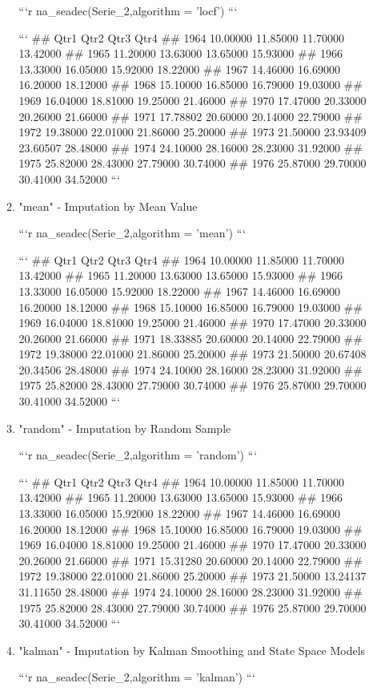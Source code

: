 \documentclass[
]{article}
\begin{document}
\begin{enumerate}
\begin{enumerate}
```r
na_seadec(Serie_2,algorithm = 'locf')
```

```
##          Qtr1     Qtr2     Qtr3     Qtr4
## 1964 10.00000 11.85000 11.70000 13.42000
## 1965 11.20000 13.63000 13.65000 15.93000
## 1966 13.33000 16.05000 15.92000 18.22000
## 1967 14.46000 16.69000 16.20000 18.12000
## 1968 15.10000 16.85000 16.79000 19.03000
## 1969 16.04000 18.81000 19.25000 21.46000
## 1970 17.47000 20.33000 20.26000 21.66000
## 1971 17.78802 20.60000 20.14000 22.79000
## 1972 19.38000 22.01000 21.86000 25.20000
## 1973 21.50000 23.93409 23.60507 28.48000
## 1974 24.10000 28.16000 28.23000 31.92000
## 1975 25.82000 28.43000 27.79000 30.74000
## 1976 25.87000 29.70000 30.41000 34.52000
```
\item "mean" - Imputation by Mean Value

```r
na_seadec(Serie_2,algorithm = 'mean')
```

```
##          Qtr1     Qtr2     Qtr3     Qtr4
## 1964 10.00000 11.85000 11.70000 13.42000
## 1965 11.20000 13.63000 13.65000 15.93000
## 1966 13.33000 16.05000 15.92000 18.22000
## 1967 14.46000 16.69000 16.20000 18.12000
## 1968 15.10000 16.85000 16.79000 19.03000
## 1969 16.04000 18.81000 19.25000 21.46000
## 1970 17.47000 20.33000 20.26000 21.66000
## 1971 18.33885 20.60000 20.14000 22.79000
## 1972 19.38000 22.01000 21.86000 25.20000
## 1973 21.50000 20.67408 20.34506 28.48000
## 1974 24.10000 28.16000 28.23000 31.92000
## 1975 25.82000 28.43000 27.79000 30.74000
## 1976 25.87000 29.70000 30.41000 34.52000
```
\item "random" - Imputation by Random Sample

```r
na_seadec(Serie_2,algorithm = 'random')
```

```
##          Qtr1     Qtr2     Qtr3     Qtr4
## 1964 10.00000 11.85000 11.70000 13.42000
## 1965 11.20000 13.63000 13.65000 15.93000
## 1966 13.33000 16.05000 15.92000 18.22000
## 1967 14.46000 16.69000 16.20000 18.12000
## 1968 15.10000 16.85000 16.79000 19.03000
## 1969 16.04000 18.81000 19.25000 21.46000
## 1970 17.47000 20.33000 20.26000 21.66000
## 1971 15.31280 20.60000 20.14000 22.79000
## 1972 19.38000 22.01000 21.86000 25.20000
## 1973 21.50000 13.24137 31.11650 28.48000
## 1974 24.10000 28.16000 28.23000 31.92000
## 1975 25.82000 28.43000 27.79000 30.74000
## 1976 25.87000 29.70000 30.41000 34.52000
```
\item "kalman" - Imputation by Kalman Smoothing and State Space Models

```r
na_seadec(Serie_2,algorithm = 'kalman')
```


\end{enumerate}
\end{enumerate}
\end{document}
